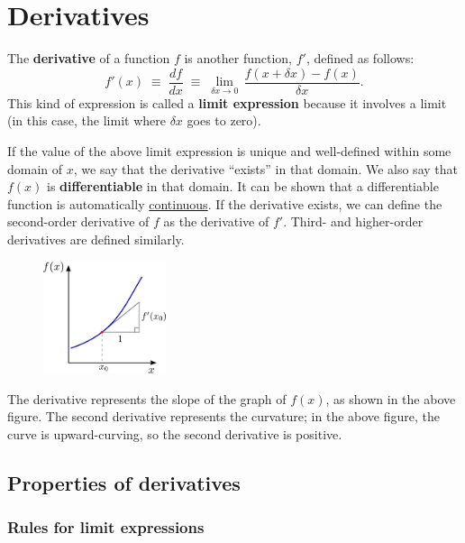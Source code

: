 \documentclass[10pt,a4paper]{article}
\begin{document}
\setcounter{page}{7}

\section{Derivatives}\label{derivatives}

 The \textbf{derivative} of a function $f$ is another function,
$f'$, defined as follows:
\begin{equation}
f'(x) \;\equiv\; \frac{df}{dx} \;\equiv\; \lim_{\delta x \rightarrow 0} \, \frac{f(x + \delta x) - f(x)}{\delta x}.
\end{equation}
This kind of expression is called a \textbf{limit expression} because it
involves a limit (in this case, the limit where $\delta x$ goes to
zero).

If the value of the above limit expression is unique and well-defined
within some domain of $x$, we say that the derivative ``exists'' in
that domain. We also say that $f(x)$ is \textbf{differentiable} in
that domain. It can be shown that a differentiable function is
automatically \href{00_mathfunctions.ipynb\#continuity}{continuous}.
If the derivative exists, we can define the second-order derivative of
$f$ as the derivative of $f'$. Third- and higher-order derivatives are
defined similarly.

\begin{figure}[h]
  \centering\includegraphics[width=0.32\textwidth]{derivative}
\end{figure}

The derivative represents the slope of the graph of $f(x)$, as shown
in the above figure.  The second derivative represents the curvature;
in the above figure, the curve is upward-curving, so the second
derivative is positive.

\subsection{Properties of derivatives}
\label{properties-of-derivatives}

\hypertarget{rules-for-limit-expressions}{%
\subsubsection{Rules for limit
expressions}\label{rules-for-limit-expressions}}
\end{document}
